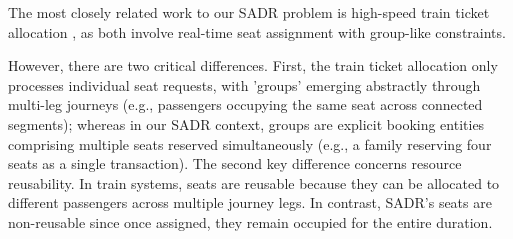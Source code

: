 

 

The most closely related work to our SADR problem is high-speed train ticket allocation \citep{zhu2023assign}, as both involve real-time seat assignment with group-like constraints. 


However, there are two critical differences. First, the train ticket allocation only processes individual seat requests, with 'groups' emerging abstractly through multi-leg journeys (e.g., passengers occupying the same seat across connected segments); whereas in our SADR context, groups are explicit booking entities comprising multiple seats reserved simultaneously (e.g., a family reserving four seats as a single transaction). The second key difference concerns resource reusability. In train systems, seats are reusable because they can be allocated to different passengers across multiple journey legs. In contrast, SADR's seats are non-reusable since once assigned, they remain occupied for the entire duration. 


 

